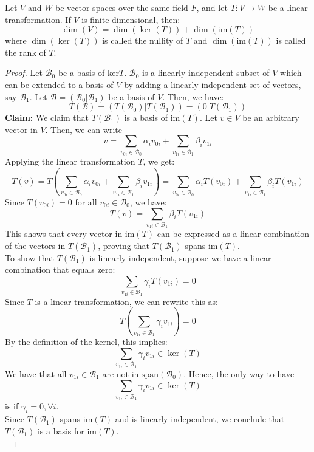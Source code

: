 \documentclass[openany]{book}
\begin{document}
\begin{mytheorem}
    Let $V$ and $W$ be vector spaces over the same field $F$, and let $T: V \to W$ be a linear transformation. If $V$ is finite-dimensional, then:
    $$\dim(V) = \dim(\ker(T)) + \dim(\text{im}(T))$$
    where $\dim(\ker(T))$ is called the nullity of $T$ and $\dim(\text{im}(T))$ is called the rank of $T$.
\end{mytheorem}
\begin{proof}
    Let $\mathcal{B}_0$ be a basis of $\text{ker} T$. $\mathcal{B}_0$ is a linearly independent subset of $V$ which can be extended to a basis of $V$ by adding a linearly independent set of vectors, say $\mathcal{B}_1$. Let $\mathcal{B} = (\mathcal{B}_0 | \mathcal{B}_1)$ be a basis of $V$. Then, we have:
    $$T(\mathcal{B}) = (T(\mathcal{B}_0) | T(\mathcal{B}_1)) = (0 | T(\mathcal{B}_1))$$
    \textbf{Claim: } We claim that $T(\mathcal{B}_1)$ is a basis of $\text{im}(T)$.
    Let $v \in V$ be an arbitrary vector in $V$. Then, we can write -
    $$v = \sum_{v_{0i} \in \mathcal{B}_0}\alpha_{i}v_{0i} + \sum_{v_{1i} \in \mathcal{B}_1}\beta_{i}v_{1i}$$
    Applying the linear transformation $T$, we get:
    $$T(v) = T\left(\sum_{v_{0i} \in \mathcal{B}_0}\alpha_{i}v_{0i} + \sum_{v_{1i} \in \mathcal{B}_1}\beta_{i}v_{1i}\right) = \sum_{v_{0i} \in \mathcal{B}_0}\alpha_{i}T(v_{0i}) + \sum_{v_{1i} \in \mathcal{B}_1}\beta_{i}T(v_{1i})$$
    Since $T(v_{0i}) = 0$ for all $v_{0i} \in \mathcal{B}_0$, we have:
    $$T(v) = \sum_{v_{1i} \in \mathcal{B}_1}\beta_{i}T(v_{1i})$$
    This shows that every vector in $\text{im}(T)$ can be expressed as a linear combination of the vectors in $T(\mathcal{B}_1)$, proving that $T(\mathcal{B}_1)$ spans $\text{im}(T)$. \\
    To show that $T(\mathcal{B}_1)$ is linearly independent, suppose we have a linear combination that equals zero:
    $$\sum_{v_{1i} \in \mathcal{B}_1}\gamma_{i}T(v_{1i}) = 0$$
    Since $T$ is a linear transformation, we can rewrite this as:
    $$T\left(\sum_{v_{1i} \in \mathcal{B}_1}\gamma_{i}v_{1i}\right) = 0$$
    By the definition of the kernel, this implies:
    $$\sum_{v_{1i} \in \mathcal{B}_1}\gamma_{i}v_{1i} \in \ker(T)$$
    We have that all $v_{1i} \in \mathcal{B}_1$ are not in $\text{span}(\mathcal{B}_0)$. Hence, the only way to have $$\sum_{v_{1i} \in \mathcal{B}_1}\gamma_{i}v_{1i} \in \ker(T)$$ is if $\gamma_i = 0,\forall i$. \\
    Since $T(\mathcal{B}_1)$ spans $\text{im}(T)$ and is linearly independent, we conclude that $T(\mathcal{B}_1)$ is a basis for $\text{im}(T)$. \\ 

\end{proof}
\end{document}
